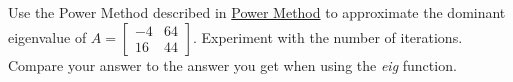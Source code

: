 \documentclass{ximera}
\begin{document}
\begin{problem}\label{prob_oct_eig4}
    Use the Power Method described in \href{}{Power Method} to approximate the dominant eigenvalue of 
    $A=\begin{bmatrix}-4 & 64\\ 16 & 44\end{bmatrix}$.  Experiment with the number of iterations.  Compare your answer to the answer you get when using the \emph{eig} function.
\end{problem}
 
\end{document}

